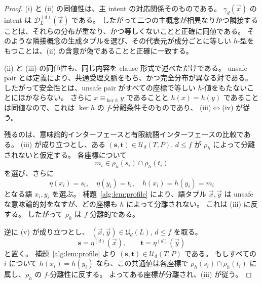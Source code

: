 \documentclass[10pt,a4paper]{ltjsarticle}
\theoremstyle{definition}
\theoremstyle{remark}
\newcommand{\D}{\mathcal D}
\begin{document}
\begin{proof}
\textup{(i)} と \textup{(ii)} の同値性は、主 intent の対応関係そのものである。
$\gamma_d(\vec x)$ の intent は $\D_L^{(d)}(\vec x)$ である。
したがって二つの主概念が相異なりかつ隣接することは、それらの分布が重なり、かつ等しくないことと正確に同値である。
そのような隣接概念の生成タプルを選び、その代表元が成分ごとに等しい $h$-型をもつことは、\textup{(ii)} の含意が偽であることと正確に一致する。

\textup{(ii)} と \textup{(iii)} の同値性も、同じ内容を clause 形式で述べただけである。
unsafe pair とは定義により、共通受理文脈をもち、かつ完全分布が異なる対である。
したがって安全性とは、unsafe pair がすべての座標で等しい $h$-値をもたないことにほかならない。
さらに
$x\equiv_{\ker h}y$
であることと $h(x)=h(y)$ であることは同値なので、これは $\ker h$ の $f$-分離条件そのものであり、
\textup{(iii)}$\Longleftrightarrow$\textup{(iv)}
が従う。

残るのは、意味論的インターフェースと有限統語インターフェースの比較である。
\textup{(iii)} が成り立つとし、ある
$(\mathbf s,\mathbf t)\in\mathcal U_d(T,P)$, $d\le f$
が $\rho_h$ によって分離されないと仮定する。
各座標について
\[
m_i\in\rho_h(s_i)\cap\rho_h(t_i)
\]
を選び、さらに
\[
\eta(x_i)=s_i,
\quad
\eta(y_i)=t_i,
\quad
h(x_i)=h(y_i)=m_i
\]
となる語 $x_i,y_i$ を選ぶ。
補題~\ref{alg:lem:profile} により、語タプル $\vec x,\vec y$ は unsafe な意味論的対をなすが、どの座標も $h$ によって分離されない。
これは \textup{(iii)} に反する。
したがって $\rho_h$ は $f$-分離的である。

逆に \textup{(v)} が成り立つとし、
$(\vec x,\vec y)\in\mathfrak U_d(L)$, $d\le f$
を取る。
\[
\mathbf s=\eta^{(d)}(\vec x),
\qquad
\mathbf t=\eta^{(d)}(\vec y)
\]
と置く。
補題~\ref{alg:lem:profile} より
$(\mathbf s,\mathbf t)\in\mathcal U_d(T,P)$
である。
もしすべての $i$ について $h(x_i)=h(y_i)$ なら、この共通値は各座標で
$\rho_h(s_i)\cap\rho_h(t_i)$
に属し、$\rho_h$ の $f$-分離性に反する。
よってある座標が分離され、\textup{(iii)} が従う。
\end{proof}
\end{document}
